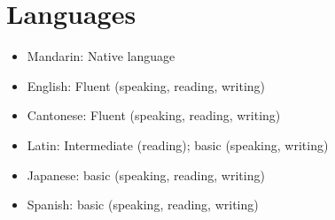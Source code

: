 
\section{\sc Languages}

\begin{itemize}
    \item Mandarin: Native language
    \item English: Fluent (speaking, reading, writing)
    \item Cantonese: Fluent (speaking, reading, writing)
    \item Latin: Intermediate (reading); basic (speaking, writing)
    \item Japanese: basic (speaking, reading, writing)
    \item Spanish: basic (speaking, reading, writing)
\end{itemize}
